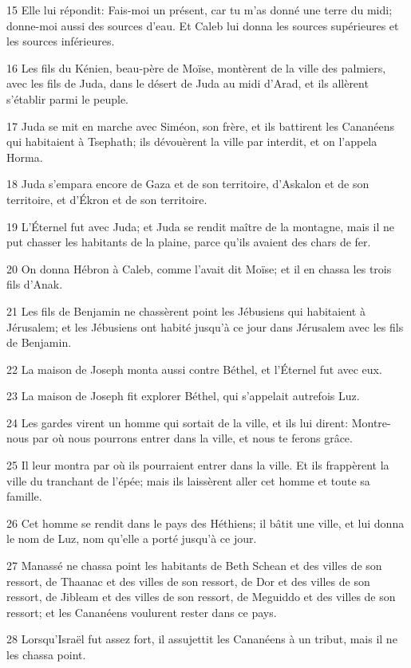 \par 15 Elle lui répondit: Fais-moi un présent, car tu m'as donné une terre du midi; donne-moi aussi des sources d'eau. Et Caleb lui donna les sources supérieures et les sources inférieures.
\par 16 Les fils du Kénien, beau-père de Moïse, montèrent de la ville des palmiers, avec les fils de Juda, dans le désert de Juda au midi d'Arad, et ils allèrent s'établir parmi le peuple.
\par 17 Juda se mit en marche avec Siméon, son frère, et ils battirent les Cananéens qui habitaient à Tsephath; ils dévouèrent la ville par interdit, et on l'appela Horma.
\par 18 Juda s'empara encore de Gaza et de son territoire, d'Askalon et de son territoire, et d'Ékron et de son territoire.
\par 19 L'Éternel fut avec Juda; et Juda se rendit maître de la montagne, mais il ne put chasser les habitants de la plaine, parce qu'ils avaient des chars de fer.
\par 20 On donna Hébron à Caleb, comme l'avait dit Moïse; et il en chassa les trois fils d'Anak.
\par 21 Les fils de Benjamin ne chassèrent point les Jébusiens qui habitaient à Jérusalem; et les Jébusiens ont habité jusqu'à ce jour dans Jérusalem avec les fils de Benjamin.
\par 22 La maison de Joseph monta aussi contre Béthel, et l'Éternel fut avec eux.
\par 23 La maison de Joseph fit explorer Béthel, qui s'appelait autrefois Luz.
\par 24 Les gardes virent un homme qui sortait de la ville, et ils lui dirent: Montre-nous par où nous pourrons entrer dans la ville, et nous te ferons grâce.
\par 25 Il leur montra par où ils pourraient entrer dans la ville. Et ils frappèrent la ville du tranchant de l'épée; mais ils laissèrent aller cet homme et toute sa famille.
\par 26 Cet homme se rendit dans le pays des Héthiens; il bâtit une ville, et lui donna le nom de Luz, nom qu'elle a porté jusqu'à ce jour.
\par 27 Manassé ne chassa point les habitants de Beth Schean et des villes de son ressort, de Thaanac et des villes de son ressort, de Dor et des villes de son ressort, de Jibleam et des villes de son ressort, de Meguiddo et des villes de son ressort; et les Cananéens voulurent rester dans ce pays.
\par 28 Lorsqu'Israël fut assez fort, il assujettit les Cananéens à un tribut, mais il ne les chassa point.
